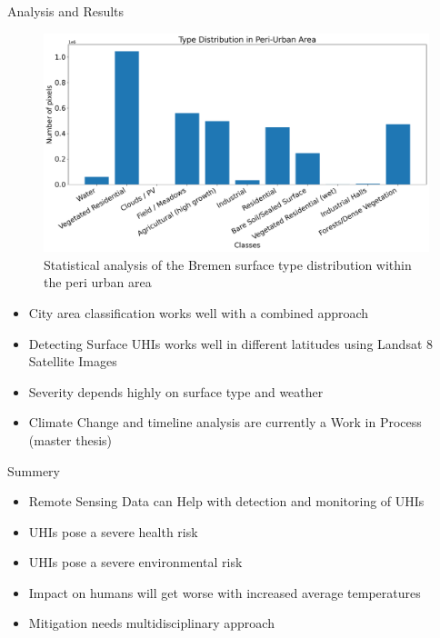 \documentclass[final,20pt]{beamer}
\newlength{\colwidth}
\begin{document}
\begin{frame}[t]
\begin{columns}[t]
\begin{column}{\colwidth}
  \begin{block}{Analysis and Results}
    \begin{figure}
        \centering
        \includegraphics[width=\linewidth]{figures/ClassDistributionPU2019-06-29.png}
        \caption{Statistical analysis of the Bremen surface type distribution within the peri urban area}
    \end{figure}
    \begin{itemize}
      \setlength\itemsep{0.5em}
      \item City area classification works well with a combined approach
      \item Detecting Surface UHIs works well in different latitudes using Landsat 8 Satellite Images
      \item Severity depends highly on surface type and weather
      \item Climate Change and timeline analysis are currently a Work in Process (master thesis)
    \end{itemize}
  \end{block}


  \begin{alertblock}{Summery}
    \begin{itemize}
      \setlength\itemsep{0.5em}
      \item Remote Sensing Data can Help with detection and monitoring of UHIs
      \item UHIs pose a severe health risk
      \item UHIs pose a severe environmental risk
      \item Impact on humans will get worse with increased average temperatures
      \item Mitigation needs multidisciplinary approach
    \end{itemize}
  \end{alertblock}


\end{column}
\end{columns}
\end{frame}
\end{document}
